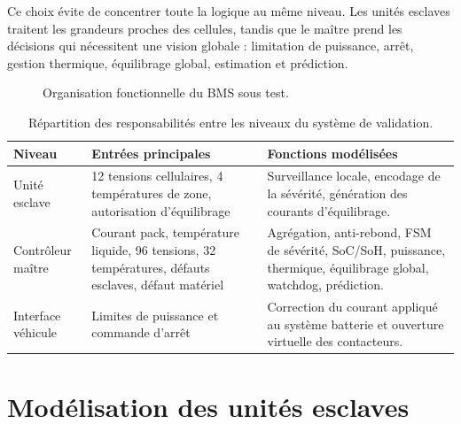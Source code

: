 \noindent
Ce choix évite de concentrer toute la logique au même niveau. Les unités esclaves traitent les grandeurs proches des cellules, tandis que le maître prend les décisions qui nécessitent une vision globale : limitation de puissance, arrêt, gestion thermique, équilibrage global, estimation et prédiction.

\begin{figure}[H]
  \centering
  \captionsetup{width=0.84\textwidth, skip=15pt}
  \caption{Organisation fonctionnelle du BMS sous test.}
  \label{fig:ch4_architecture_hierarchique}
\end{figure}

\begin{table}[H]
  \centering
  \small
  \begin{tabularx}{\textwidth}{|l|X|X|}
    \hline
    \textbf{Niveau} & \textbf{Entrées principales} & \textbf{Fonctions modélisées} \\
    \hline
    Unité esclave & 12 tensions cellulaires, 4 températures de zone, autorisation d'équilibrage & Surveillance locale, encodage de la sévérité, génération des courants d'équilibrage. \\
    \hline
    Contrôleur maître & Courant pack, température liquide, 96 tensions, 32 températures, défauts esclaves, défaut matériel & Agrégation, anti-rebond, FSM de sévérité, SoC/SoH, puissance, thermique, équilibrage global, watchdog, prédiction. \\
    \hline
    Interface véhicule & Limites de puissance et commande d'arrêt & Correction du courant appliqué au système batterie et ouverture virtuelle des contacteurs. \\
    \hline
  \end{tabularx}
  \captionsetup{width=0.88\textwidth, skip=15pt}
  \caption{Répartition des responsabilités entre les niveaux du système de validation.}
  \label{tab:ch4_repartition_fonctions}
\end{table}

\section{Modélisation des unités esclaves}
\label{sec:ch4_unites_esclaves}

